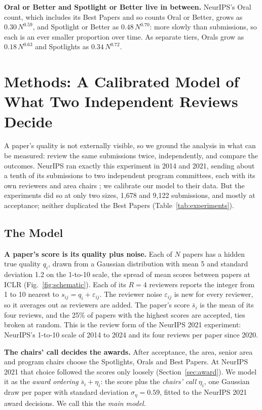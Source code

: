 \documentclass{article}
\begin{document}
\textbf{Oral or Better and Spotlight or Better live in between.}
NeurIPS's Oral count, which includes its Best Papers and so counts Oral or Better, grows as $0.30\,N^{0.59}$, and Spotlight or Better as $0.48\,N^{0.70}$: more slowly than submissions, so each is an ever smaller proportion over time. As separate tiers, Orals grow as $0.18\,N^{0.63}$ and Spotlights as $0.34\,N^{0.72}$.


\section{Methods: A Calibrated Model of What Two Independent Reviews Decide}\label{sec:methods}

A paper's quality is not externally visible, so we ground the analysis in what can be measured: review the same submissions twice, independently, and compare the outcomes. NeurIPS ran exactly this experiment in 2014 and 2021, sending about a tenth of its submissions to two independent program committees, each with its own reviewers and area chairs \citep{lawrence2014nips,cortes2021inconsistency,beygelzimer2023neurips}; we calibrate our model to their data.
But the experiments did so at only two sizes, 1,678 and 9,122 submissions, and mostly at acceptance; neither duplicated the Best Papers (Table~\ref{tab:experiments}).

\subsection{The Model}\label{sec:model}

\textbf{A paper's score is its quality plus noise.} Each of $N$ papers has a hidden true quality $q_i$, drawn from a Gaussian distribution with mean 5 and standard deviation 1.2 on the 1-to-10 scale, the spread of mean scores between papers at ICLR (Fig.~\ref{fig:schematic}). Each of its $R=4$ reviewers reports the integer from 1 to 10 nearest to $s_{ij}=q_i+\varepsilon_{ij}$. The reviewer noise $\varepsilon_{ij}$ is new for every reviewer, so it averages out as reviewers are added. The paper's score $\bar s_i$ is the mean of its four reviews, and the 25\% of papers with the highest scores are accepted, ties broken at random. This is the review form of the NeurIPS 2021 experiment: NeurIPS's 1-to-10 scale of 2014 to 2024 and its four reviews per paper since 2020.

\textbf{The chairs' call decides the awards.} After acceptance, the area, senior area and program chairs choose the Spotlights, Orals and Best Papers. At NeurIPS 2021 that choice followed the scores only loosely (Section~\ref{sec:award}). We model it as the \emph{award ordering} $\bar s_i+\eta_i$: the score plus the \emph{chairs' call} $\eta_i$, one Gaussian draw per paper with standard deviation $\sigma_\eta=0.59$, fitted to the NeurIPS 2021 award decisions. We call this the \emph{main model}.
\end{document}

